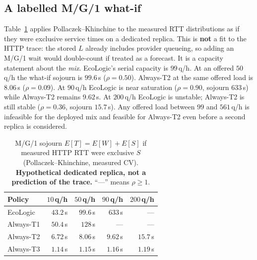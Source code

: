 \documentclass[10pt,conference]{IEEEtran}
\begin{document}
\subsection{A labelled M/G/1 what-if}
\label{sec:mg1}
Table~\ref{tab:mg1} applies Pollaczek--Khinchine to the measured RTT distributions as if they were exclusive service times on a dedicated replica. This is \textbf{not} a fit to the HTTP trace: the stored $L$ already includes provider queueing, so adding an M/G/1 wait would double-count if treated as a forecast. It is a capacity statement about the \emph{mix}. EcoLogic's serial capacity is $99$\,q/h. At an offered $50$\,q/h the what-if sojourn is $99.6$\,s ($\rho{=}0.50$). Always-T2 at the same offered load is $8.06$\,s ($\rho{=}0.09$). At $90$\,q/h EcoLogic is near saturation ($\rho{=}0.90$, sojourn $633$\,s) while Always-T2 remains $9.62$\,s. At $200$\,q/h EcoLogic is unstable; Always-T2 is still stable ($\rho{=}0.36$, sojourn $15.7$\,s). Any offered load between $99$ and $561$\,q/h is infeasible for the deployed mix and feasible for Always-T2 even before a second replica is considered.

\begin{table}[t]
\centering
\caption{M/G/1 sojourn $E[T]{=}E[W]{+}E[S]$ if measured HTTP RTT were exclusive $S$ (Pollaczek--Khinchine, measured CV). \textbf{Hypothetical dedicated replica, not a prediction of the trace.} ``---'' means $\rho\ge 1$.}
\label{tab:mg1}
\setlength{\tabcolsep}{3.0pt}
\begin{tabular}{@{}lrrrr@{}}
\toprule
Policy & $10$\,q/h & $50$\,q/h & $90$\,q/h & $200$\,q/h \\
\midrule
EcoLogic & $43.2$\,s & $99.6$\,s & $633$\,s & --- \\
Always-T1 & $50.4$\,s & $128$\,s & --- & --- \\
Always-T2 & $6.72$\,s & $8.06$\,s & $9.62$\,s & $15.7$\,s \\
Always-T3 & $1.14$\,s & $1.15$\,s & $1.16$\,s & $1.19$\,s \\
\bottomrule
\end{tabular}
\end{table}
\end{document}
